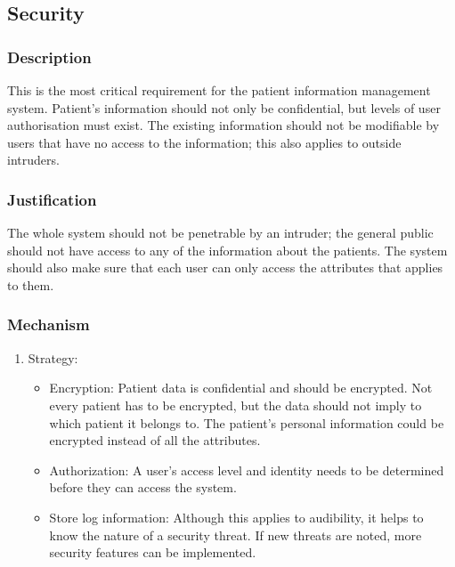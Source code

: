 \subsection{Security}
\subsubsection{Description}
This is the most critical requirement for the patient information management system. Patient's information should not only be 
confidential, but levels of user authorisation must exist. The existing information should not be modifiable by users that have no 
access to the information; this also applies to outside intruders.
\subsubsection{Justification}
The whole system should not be penetrable by an intruder; the general public should not have access to any of the information about the patients. The system should also make sure that each user can only access the attributes that applies to them.
\subsubsection{Mechanism}
	\begin{enumerate}
		\item Strategy:
		
		 	\begin{itemize}
		 	\item Encryption: Patient data is confidential and should be encrypted. Not every patient has to be encrypted, but 
		 	the data should not imply to which patient it belongs to. The patient's personal information could be encrypted instead 			of all the attributes.
		 	\item Authorization: A user's access level and identity needs to be determined before they can access the system. 
		 	\item Store log information: Although this applies to audibility, it helps to know the nature of a security threat.   					If new threats are noted, more security features can be implemented.
		 	\end{itemize}

	\end{enumerate}